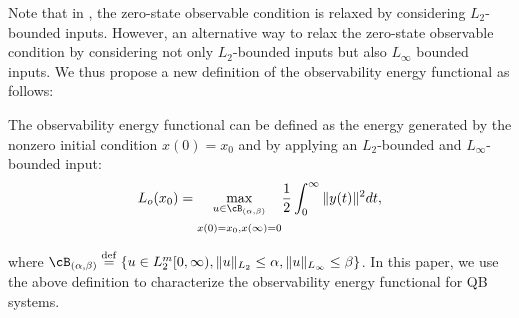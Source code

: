 Note that in , the zero-state observable condition is relaxed by considering $L_2$-bounded inputs.  However, an alternative way to relax the zero-state observable condition by considering not only $L_2$-bounded inputs but also  $L_\infty$ bounded inputs. We thus propose a new definition of the observability energy functional as follows:

\begin{definition}\label{def:obser3}
	The observability energy functional can be defined as the  energy generated by the nonzero initial condition $x(0) = x_0$ and by applying an $L_2$-bounded and $L_\infty$-bounded input:
	\begin{equation*}
	L_o(x_0) = \underset{\begin{subarray}{c}
		u\in \cB_{(\alpha,\beta)} \\[5pt]
		x(0) = x_0,x(\infty)=0
		\end{subarray}  }{\max} \dfrac{1}{2}\int_0^\infty \|y(t)\|^2dt,
	\end{equation*}
\end{definition}
where $\cB_{(\alpha,\beta)} \overset{\mathrm{def}}{=} \{u \in L_2^m[0,\infty), \|u\|_{L_2}\leq \alpha, \|u\|_{L_\infty}\leq \beta \}$. In this paper, we use the above definition to characterize the observability energy functional for QB systems. 
